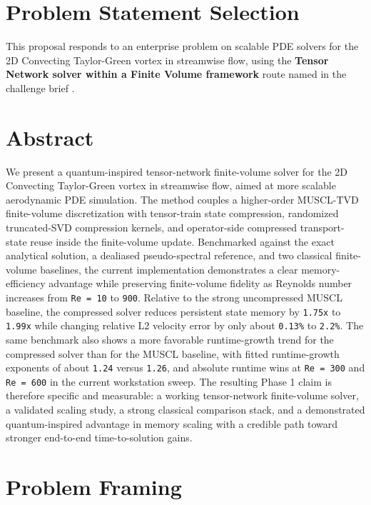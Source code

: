 \documentclass[11pt,a4paper]{article}
\begin{document}
\section*{Problem Statement Selection}

This proposal responds to an enterprise problem on scalable PDE solvers for the 2D Convecting Taylor-Green vortex in streamwise flow, using the \textbf{Tensor Network solver within a Finite Volume framework} route named in the challenge brief \cite{ChallengeBrief2025}.

\section*{Abstract}

We present a quantum-inspired tensor-network finite-volume solver for the 2D Convecting Taylor-Green vortex in streamwise flow, aimed at more scalable aerodynamic PDE simulation. The method couples a higher-order MUSCL-TVD finite-volume discretization with tensor-train state compression, randomized truncated-SVD compression kernels, and operator-side compressed transport-state reuse inside the finite-volume update. Benchmarked against the exact analytical solution, a dealiased pseudo-spectral reference, and two classical finite-volume baselines, the current implementation demonstrates a clear memory-efficiency advantage while preserving finite-volume fidelity as Reynolds number increases from \texttt{Re = 10} to \texttt{900}. Relative to the strong uncompressed MUSCL baseline, the compressed solver reduces persistent state memory by \texttt{1.75x} to \texttt{1.99x} while changing relative L2 velocity error by only about \texttt{0.13\%} to \texttt{2.2\%}. The same benchmark also shows a more favorable runtime-growth trend for the compressed solver than for the MUSCL baseline, with fitted runtime-growth exponents of about \texttt{1.24} versus \texttt{1.26}, and absolute runtime wins at \texttt{Re = 300} and \texttt{Re = 600} in the current workstation sweep. The resulting Phase 1 claim is therefore specific and measurable: a working tensor-network finite-volume solver, a validated scaling study, a strong classical comparison stack, and a demonstrated quantum-inspired advantage in memory scaling with a credible path toward stronger end-to-end time-to-solution gains.

\section{Problem Framing}
\end{document}
